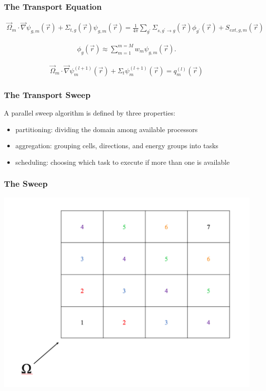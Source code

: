 \documentclass[]{beamer}
\newcommand{\vr}{\vec{r}}
\newcommand{\vo}{\vec{\Omega}}
\begin{document}
\begin{frame}[t]\frametitle{The Transport Equation}
	\begin{block}{}
	\begin{align*}
	\vo_m \cdot \vec \nabla \psi_{g,m}(\vr) +\Sigma_{t,g}(\vr) \psi_{g,m}(\vr)  = \frac{1}{4\pi}\sum_{g^{\prime}}\Sigma_{s,g^{\prime}\to g}(\vr)\phi_{g^{\prime}}(\vr) + S_{ext,g,m}(\vr)
	\end{align*}
	\end{block}
	\begin{block}{}
	\begin{align*}
	\phi_g(\vr) \approx \sum_{m=1}^{m=M} w_m \psi_{g,m}(\vr).
	\end{align*}
	\end{block}
	\begin{block}{}
	\begin{align*}
	\vo_m \cdot \vec\nabla \psi_m^{(l+1)}(\vr) + \Sigma_t \psi_m^{(l+1)}(\vr) = q_m^{(l)}(\vr)
	\end{align*}
	\end{block}
\end{frame}

\begin{frame}[t]\frametitle{The Transport Sweep}
	\begin{block}{}
	A parallel sweep algorithm is defined by three properties:
	\begin{itemize}
		\item partitioning: dividing the domain among available processors
		\item aggregation: grouping cells, directions, and energy groups into tasks
		\item scheduling: choosing which task to execute if more than one is available
	\end{itemize}
	\end{block}
	
\end{frame}

\begin{frame}[t]\frametitle{The Sweep}
\includegraphics[scale = 0.34]{figures/StructuredMesh.pdf}
\end{frame}
\end{document}
